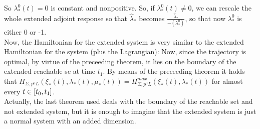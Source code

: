 So $\lambda_*^0(t)=0$ is constant and nonpositive. So, if $\lambda_*^0(t)\neq0$, we can rescale the whole extended adjoint response so that $\hat{\lambda}_*$ becomes $\frac{\hat{\lambda}_*}{-(\lambda_*^0)}$, so that now $\lambda_*^0$ is either 0 or -1.\\
Now, the Hamiltonian for the extended system is very similar to the extended Hamiltonian for the system (plus the Lagrangian):
Now, since the trajectory is optimal, by %
\label{REFERENCES TO BE DONE!} virtue of the preceeding theorem, it lies on the boundary of the extended reachable se at time $t_1$. By means of the preceeding theorem %
\label{REFREFREFREF3}
it holds that $H_{\Sigma,p^0L}(\xi_*(t),\lambda_*(t),\mu_*(t))=
H_{\Sigma,p^0L}^{max}(\xi_*(t),\lambda_*(t))$ for almost every $t\in[t_0,t_1]$.\\
Actually, the last theorem used deals with the boundary of the reachable set and not extended system, but it is enough to imagine that the extended system is just a normal system with an added dimension. 